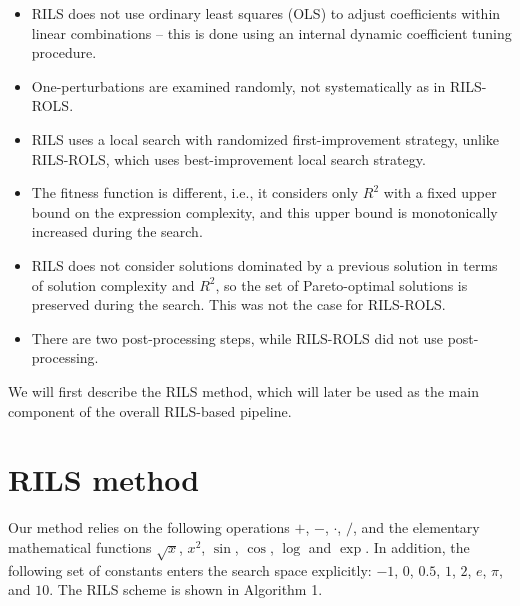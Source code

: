 \documentclass{article}
\begin{document}
\begin{itemize} 
\item RILS does not use ordinary least squares (OLS) to adjust coefficients within linear combinations -- this is done using an internal dynamic coefficient tuning procedure. 
\item One-perturbations are examined randomly, not systematically as in RILS-ROLS. 
\item RILS uses a local search with randomized first-improvement strategy, unlike RILS-ROLS, which uses best-improvement local search strategy. 
\item The fitness function is different, i.e., it considers only $R^2$ with a fixed upper bound on the expression complexity, and this upper bound is monotonically increased during the search. 
\item RILS does not consider solutions dominated by a previous solution in terms of solution complexity and $R^2$, so the set of Pareto-optimal solutions is preserved during the search. This was not the case for RILS-ROLS. 
\item There are two post-processing steps, while RILS-ROLS did not use post-processing.
\end{itemize}

We will first describe the RILS method, which will later be used as the main component of the overall RILS-based pipeline.

\section{RILS method}\label{sec:rils}

Our method relies on the following operations $+$, $-$, $\cdot$, $/$, and the elementary mathematical functions $\sqrt{x}$, $x^2 $, $\sin$, $\cos$, $\log$ and $\exp$. In addition, the following set of constants enters the search space explicitly: $-1$, $0$, $0.5$, $1$, $2$, $e$, $\pi$, and $10$. The RILS scheme is shown in Algorithm 1.   
\end{document}
